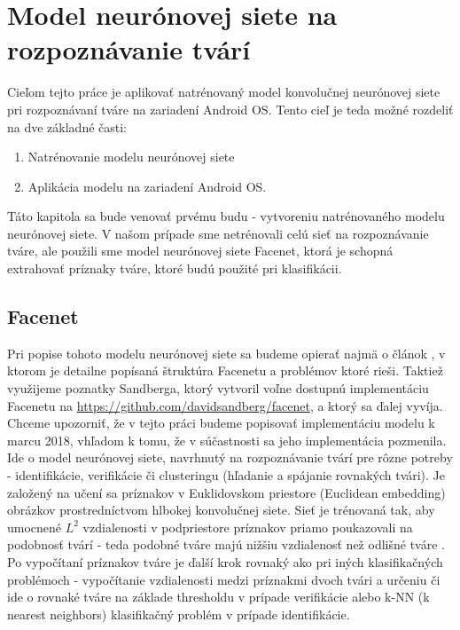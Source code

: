 \section{Model neurónovej siete na rozpoznávanie tvárí}
Cieľom tejto práce je aplikovať natrénovaný model konvolučnej neurónovej siete pri rozpoznávaní tváre na zariadení Android OS.
Tento cieľ je teda možné rozdeliť na dve základné časti:
\begin{enumerate}
	\item Natrénovanie modelu neurónovej siete
	\item Aplikácia modelu na zariadení Android OS.
\end{enumerate}

Táto kapitola sa bude venovať prvému budu - vytvoreniu natrénovaného modelu neurónovej siete.
V našom prípade sme netrénovali celú sieť na rozpoznávanie tváre, ale použili sme model neurónovej siete Facenet, ktorá je schopná extrahovať príznaky tváre, 
ktoré budú použité pri klasifikácii.

\subsection{Facenet}
Pri popise tohoto modelu neurónovej siete sa budeme opierať najmä o článok \cite{schroff2015facenet},
v ktorom je detailne popísaná štruktúra Facenetu a problémov ktoré rieši.
Taktiež využijeme poznatky Sandberga, ktorý vytvoril voľne dostupnú implementáciu Facenetu na \url{https://github.com/davidsandberg/facenet}, a ktorý sa ďalej vyvíja.
Chceme upozorniť, že v tejto práci budeme popisovať implementáciu modelu k marcu 2018, vhľadom k tomu, že v súčastnosti sa jeho implementácia pozmenila.\\
 
\indent Ide o model neurónovej siete, navrhnutý na rozpoznávanie tvárí pre rôzne potreby - identifikácie, verifikácie či clusteringu (hľadanie a spájanie rovnakých tvári).
Je založený na učení sa príznakov v Euklidovskom priestore  (Euclidean embedding) obrázkov prostredníctvom hlbokej konvolučnej siete.
Sieť je trénovaná tak, aby umocnené $ L^2 $ vzdialenosti v podpriestore príznakov priamo poukazovali na podobnosť tvárí - teda podobné tváre majú nižšiu vzdialenosť než odlišné tváre \cite{schroff2015facenet}.
Po vypočítaní príznakov tváre je ďalší krok rovnaký ako pri iných klasifikačných problémoch - vypočítanie vzdialenosti medzi príznakmi dvoch tvári a určeniu či ide o rovnaké tváre na základe thresholdu v prípade verifikácie alebo k-NN (k nearest neighbors) klasifikačný problém v prípade identifikácie.\\

